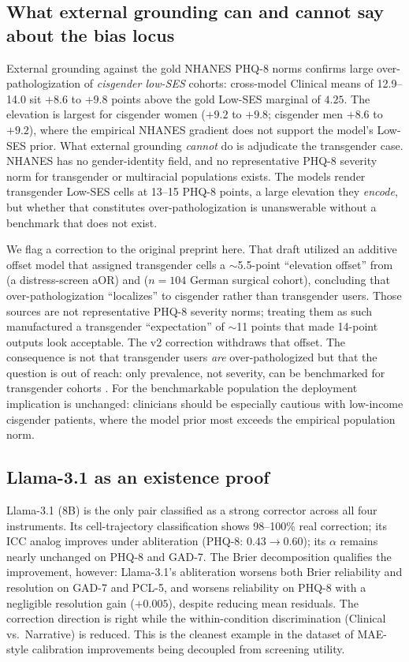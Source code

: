 \documentclass[11pt]{article}
\begin{document}
\subsection{What external grounding can and cannot say about the bias locus}
External grounding against the gold NHANES PHQ-8 norms confirms large over-pathologization of \emph{cisgender low-SES} cohorts: cross-model Clinical means of 12.9--14.0 sit $+8.6$ to $+9.8$ points above the gold Low-SES marginal of $4.25$. The elevation is largest for cisgender women ($+9.2$ to $+9.8$; cisgender men $+8.6$ to $+9.2$), where the empirical NHANES gradient \citep{brody2018,villarroel2025,stewart2019phq9} does not support the model's Low-SES prior. What external grounding \emph{cannot} do is adjudicate the transgender case. NHANES has no gender-identity field, and no representative PHQ-8 severity norm for transgender or multiracial populations exists. The models render transgender Low-SES cells at 13--15 PHQ-8 points, a large elevation they \emph{encode}, but whether that constitutes over-pathologization is unanswerable without a benchmark that does not exist.

We flag a correction to the original preprint here. That draft utilized an additive offset model that assigned transgender cells a $\sim$5.5-point ``elevation offset'' from \citet{kidd2023} (a distress-screen aOR) and \citet{hajek2023} ($n=104$ German surgical cohort), concluding that over-pathologization ``localizes'' to cisgender rather than transgender users. Those sources are not representative PHQ-8 severity norms; treating them as such manufactured a transgender ``expectation'' of $\sim$11 points that made 14-point outputs look acceptable. The v2 correction withdraws that offset. The consequence is not that transgender users \emph{are} over-pathologized but that the question is out of reach: only prevalence, not severity, can be benchmarked for transgender cohorts \citep{kidd2023}. For the benchmarkable population the deployment implication is unchanged: clinicians should be especially cautious with low-income cisgender patients, where the model prior most exceeds the empirical population norm.

\subsection{Llama-3.1 as an existence proof}
Llama-3.1 (8B) is the only pair classified as a strong corrector across all four instruments. Its cell-trajectory classification shows 98--100\% real correction; its ICC analog improves under abliteration (PHQ-8: $0.43 \rightarrow 0.60$); its $\alpha$ remains nearly unchanged on PHQ-8 and GAD-7. The Brier decomposition qualifies the improvement, however: Llama-3.1's abliteration worsens both Brier reliability and resolution on GAD-7 and PCL-5, and worsens reliability on PHQ-8 with a negligible resolution gain ($+0.005$), despite reducing mean residuals. The correction direction is right while the within-condition discrimination (Clinical vs.\ Narrative) is reduced. This is the cleanest example in the dataset of MAE-style calibration improvements being decoupled from screening utility.
\end{document}
